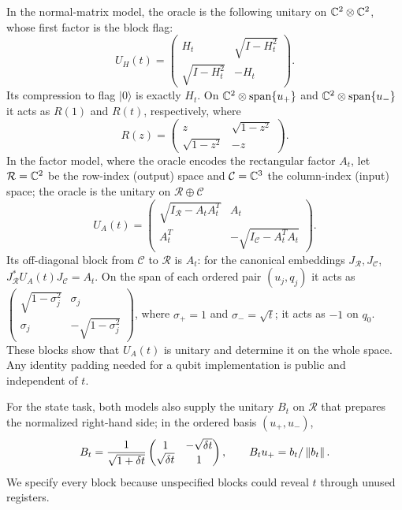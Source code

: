 In the normal-matrix model, the oracle is the following unitary on $\mathbb C^2\otimes\mathbb C^2$, whose first factor is the block flag:
\begin{equation}\label{eq:lp-H-oracle}
 U_H(t)=\begin{pmatrix}
 H_t&\sqrt{I-H_t^2}\\
 \sqrt{I-H_t^2}&-H_t
 \end{pmatrix}.
\end{equation}
Its compression to flag $|0\rangle$ is exactly $H_t$. On $\mathbb C^2\otimes\operatorname{span}\{u_+\}$ and $\mathbb C^2\otimes\operatorname{span}\{u_-\}$ it acts as $R(1)$ and $R(t)$, respectively, where
\[
 R(z)=\begin{pmatrix}z&\sqrt{1-z^2}\\\sqrt{1-z^2}&-z\end{pmatrix}.
\]
In the factor model, where the oracle encodes the rectangular factor $A_t$, let $\mathcal R=\mathbb C^2$ be the row-index (output) space and $\mathcal C=\mathbb C^3$ the column-index (input) space; the oracle is the unitary on $\mathcal R\oplus\mathcal C$
\begin{equation}\label{eq:lp-A-oracle}
 U_A(t)=\begin{pmatrix}
 \sqrt{I_{\mathcal R}-A_tA_t^T}&A_t\\
 A_t^T&-\sqrt{I_{\mathcal C}-A_t^TA_t}
 \end{pmatrix}.
\end{equation}
Its off-diagonal block from $\mathcal C$ to $\mathcal R$ is $A_t$: for the canonical embeddings $J_{\mathcal R},J_{\mathcal C}$,
$J_{\mathcal R}^*U_A(t)J_{\mathcal C}=A_t$.
On the span of each ordered pair $(u_j,q_j)$ it acts as
$\left(\begin{smallmatrix}\sqrt{1-\sigma_j^2}&\sigma_j\\\sigma_j&-\sqrt{1-\sigma_j^2}\end{smallmatrix}\right)$,
where $\sigma_+=1$ and $\sigma_-=\sqrt t$; it acts as $-1$ on $q_0$. These blocks show that $U_A(t)$ is unitary and determine it on the whole space. Any identity padding needed for a qubit implementation is public and independent of $t$.

For the state task, both models also supply the unitary $B_t$ on $\mathcal R$ that prepares the normalized right-hand side; in the ordered basis $(u_+,u_-)$,
\begin{equation}\label{eq:lp-B-oracle}
 B_t=\frac1{\sqrt{1+\delta t}}
 \begin{pmatrix}1&-\sqrt{\delta t}\\\sqrt{\delta t}&1\end{pmatrix},
 \qquad B_tu_+=b_t/\left\lVert b_t\right\rVert.
\end{equation}
We specify every block because unspecified blocks could reveal $t$ through unused registers.

